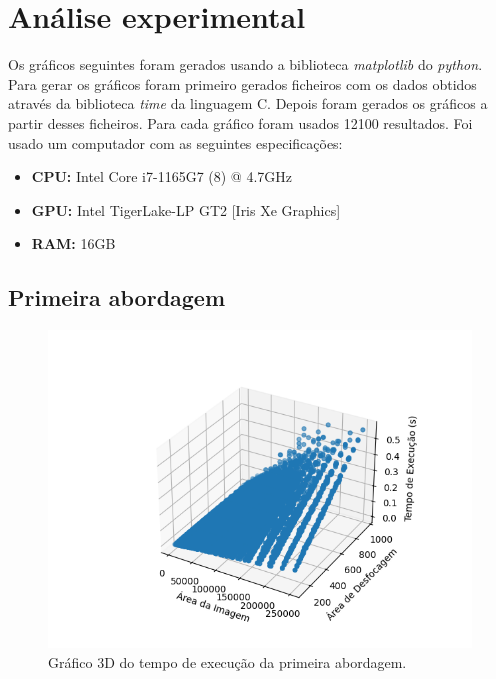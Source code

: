 \section{Análise experimental}
\label{sec:imageblur/experimental}

Os gráficos seguintes foram gerados usando a biblioteca \textit{matplotlib} do \textit{python}. Para gerar os gráficos foram primeiro gerados ficheiros com os dados obtidos através da biblioteca \textit{time} da linguagem C. Depois foram gerados os gráficos a partir desses ficheiros. Para cada gráfico foram usados 12100 resultados. Foi usado um computador com as seguintes especificações:

\begin{itemize}
    \item \textbf{CPU:} Intel Core i7-1165G7 (8) @ 4.7GHz
    \item \textbf{GPU:} Intel TigerLake-LP GT2 [Iris Xe Graphics]
    \item \textbf{RAM:} 16GB
\end{itemize}

\subsection{Primeira abordagem}

\begin{figure}[H]
    \centering
    \includegraphics[width=\linewidth]{images/first-3d_plot.png}
    \caption{Gráfico 3D do tempo de execução da primeira abordagem.}
    \label{fig:imageblur/first-3d_plot}
\end{figure}

